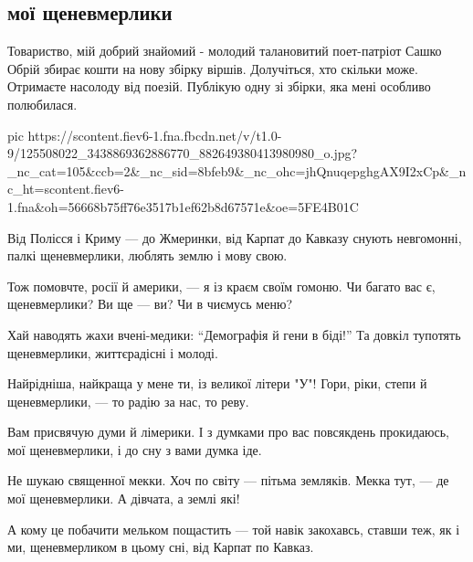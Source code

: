  
 
 
 
 
 
\subsection{мої щеневмерлики}
\label{sec:14_11_2020.fb.nitsoi_larysa.1.she_ne_vmerlyki}

Товариство, мій добрий знайомий - молодий талановитий поет-патріот Сашко Обрій
збирає кошти на нову збірку віршів. Долучіться, хто скільки може. Отримаєте
насолоду від поезій. Публікую одну зі збірки, яка мені особливо полюбилася.

\ifcmt
pic https://scontent.fiev6-1.fna.fbcdn.net/v/t1.0-9/125508022_3438869362886770_882649380413980980_o.jpg?_nc_cat=105&ccb=2&_nc_sid=8bfeb9&_nc_ohc=jhQnuqepghgAX9I2xCp&_nc_ht=scontent.fiev6-1.fna&oh=56668b75ff76e3517b1ef62b8d67571e&oe=5FE4B01C
\fi

\begin{multicols}{2}
	\obeycr
Від Полісся і Криму — до Жмеринки,
від Карпат до Кавказу снують
невгомонні, палкі щеневмерлики,
люблять землю і мову свою.

Тож помовчте, росії й америки, —
я із краєм своїм гомоню.
Чи багато вас є, щеневмерлики?
Ви  ще — ви? Чи в чиємусь меню?

Хай наводять жахи вчені-медики:
\enquote{Демографія й гени в біді!}
Та довкіл тупотять щеневмерлики,
життєрадісні і молоді.

Найрідніша, найкраща у мене ти,
із великої літери "У"!
Гори, ріки, степи й щеневмерлики, —
то радію за нас, то реву.

Вам присвячую думи й лімерики.
І з думками про вас повсякдень
прокидаюсь, мої щеневмерлики,
і до сну з вами думка іде. 

Не шукаю священної мекки.
Хоч по світу — пітьма земляків.
Мекка тут, — де мої щеневмерлики.
А дівчата, а землі які!

А кому це побачити мельком
пощастить — той навік закохавсь,
ставши теж, як і ми, щеневмерликом
в цьому сні, від Карпат по Кавказ.
	\restorecr
\end{multicols}
